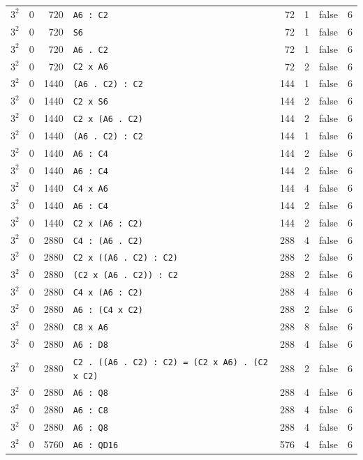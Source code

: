 \begin{longtable}{llrlrrll}
$3^2$ & 0 & 720 & \texttt{A6 : C2} & 72 & 1 & false & 6\\
$3^2$ & 0 & 720 & \texttt{S6} & 72 & 1 & false & 6\\
$3^2$ & 0 & 720 & \texttt{A6 . C2} & 72 & 1 & false & 6\\
$3^2$ & 0 & 720 & \texttt{C2 x A6} & 72 & 2 & false & 6\\
$3^2$ & 0 & 1440 & \texttt{(A6 . C2) : C2} & 144 & 1 & false & 6\\
$3^2$ & 0 & 1440 & \texttt{C2 x S6} & 144 & 2 & false & 6\\
$3^2$ & 0 & 1440 & \texttt{C2 x (A6 . C2)} & 144 & 2 & false & 6\\
$3^2$ & 0 & 1440 & \texttt{(A6 . C2) : C2} & 144 & 1 & false & 6\\
$3^2$ & 0 & 1440 & \texttt{A6 : C4} & 144 & 2 & false & 6\\
$3^2$ & 0 & 1440 & \texttt{A6 : C4} & 144 & 2 & false & 6\\
$3^2$ & 0 & 1440 & \texttt{C4 x A6} & 144 & 4 & false & 6\\
$3^2$ & 0 & 1440 & \texttt{A6 : C4} & 144 & 2 & false & 6\\
$3^2$ & 0 & 1440 & \texttt{C2 x (A6 : C2)} & 144 & 2 & false & 6\\
$3^2$ & 0 & 2880 & \texttt{C4 : (A6 . C2)} & 288 & 4 & false & 6\\
$3^2$ & 0 & 2880 & \texttt{C2 x ((A6 . C2) : C2)} & 288 & 2 & false & 6\\
$3^2$ & 0 & 2880 & \texttt{(C2 x (A6 . C2)) : C2} & 288 & 2 & false & 6\\
$3^2$ & 0 & 2880 & \texttt{C4 x (A6 : C2)} & 288 & 4 & false & 6\\
$3^2$ & 0 & 2880 & \texttt{A6 : (C4 x C2)} & 288 & 2 & false & 6\\
$3^2$ & 0 & 2880 & \texttt{C8 x A6} & 288 & 8 & false & 6\\
$3^2$ & 0 & 2880 & \texttt{A6 : D8} & 288 & 4 & false & 6\\
$3^2$ & 0 & 2880 & \texttt{C2 . ((A6 . C2) : C2) = (C2 x A6) . (C2 x C2)} & 288 & 2 & false & 6\\
$3^2$ & 0 & 2880 & \texttt{A6 : Q8} & 288 & 4 & false & 6\\
$3^2$ & 0 & 2880 & \texttt{A6 : C8} & 288 & 4 & false & 6\\
$3^2$ & 0 & 2880 & \texttt{A6 : Q8} & 288 & 4 & false & 6\\
$3^2$ & 0 & 5760 & \texttt{A6 : QD16} & 576 & 4 & false & 6\\

\end{longtable}

